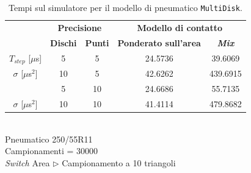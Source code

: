 \begin{table}
	\centering
	\begin{tabular}{c|c|c|c|c|}
		\cline{2-5} 
		& \multicolumn{2}{c|}{\textbf{Precisione}} &\multicolumn{2}{c|}{\textbf{Modello di contatto}} \\
		\cline{2-5} 
		& \textbf{Dischi} & \textbf{Punti} & \textbf{Ponderato sull'area} & \textbf{\textit{Mix}} \\ 
		\hline
		\multicolumn{1}{|c|}{$T_{step}$ [$\mu$s]} & 5 & 5 & 24.5736 & 39.6069 \\ 
		\hline 
		\multicolumn{1}{|c|}{$\sigma$ [$\mu$s$^2$]} & 10 & 5 & 42.6262 & 439.6915 \\ 
		\hhline{=====}
		
		\multicolumn{1}{|c|}{$T_{step}$ [$\mu$s]} & 5 & 10 & 24.6686 & 55.7135 \\ 
		\hline 
		\multicolumn{1}{|c|}{$\sigma$ [$\mu$s$^2$]} & 10 & 10 & 41.4114 & 479.8682 \\ 
		\hline
	\end{tabular}
	\\[0.5cm]
	Pneumatico 250/55R11\\
	Campionamenti = 30000\\
	\textit{Switch} Area $\triangleright$ Campionamento a 10 triangoli
	\caption{Tempi sul simulatore per il modello di pneumatico \texttt{MultiDisk}.}
	\label{MD}
\end{table}